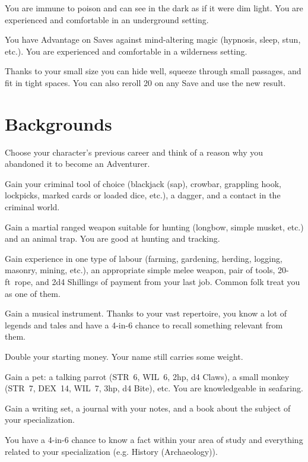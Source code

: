 \documentclass[itdr]{subfiles}
\begin{document}
\vfill
{}
You are immune to poison and can see in the dark as if it were dim light. You are experienced and comfortable in an underground setting.

\vfill
{}
You have Advantage on Saves against mind-altering magic (hypnosis, sleep, stun, etc.). You are experienced and comfortable in a wilderness setting.

\vfill
{}
Thanks to your small size you can hide well, squeeze through small passages, and fit in tight spaces. You can also reroll 20 on any Save and use the new result.

\break

\section{Backgrounds}

Choose your character's previous career and think of a reason why you abandoned it to become an \mbox{Adventurer}.

\vfill
{}
Gain your criminal tool of choice (blackjack (sap), crowbar, grappling hook, lockpicks, marked cards or loaded dice, etc.), a dagger, and a contact in the criminal world.

\vfill
{}
Gain a martial ranged weapon suitable for hunting (longbow, simple musket, etc.) and an animal trap. You are good at hunting and tracking.

\vfill
{}
Gain experience in one type of labour (farming, gardening, herding, logging, masonry, mining, etc.), an appropriate simple melee weapon, pair of tools, \mbox{20-ft rope}, and 2d4 Shillings of payment from your last job. \mbox{Common} folk treat you as one of them.

\vfill
{}
Gain a musical instrument. Thanks to your vast repertoire, you know a lot of legends and tales and have a 4-in-6 chance to recall something relevant from them.

\vfill
{}
Double your starting money. Your name still carries some weight.

\vfill
{}
Gain a pet: a talking parrot (STR~6, WIL~6, 2hp, d4 Claws), a small monkey (STR~7, DEX~14, WIL~7, 3hp, d4 Bite), etc. You are knowledgeable in seafaring.

\vfill
{}
Gain a writing set, a journal with your notes, and a book about the subject of your specialization.

You have a 4-in-6 chance to know a fact within your area of study and everything related to your specialization (e.g. History (Archaeology)).
\end{document}
